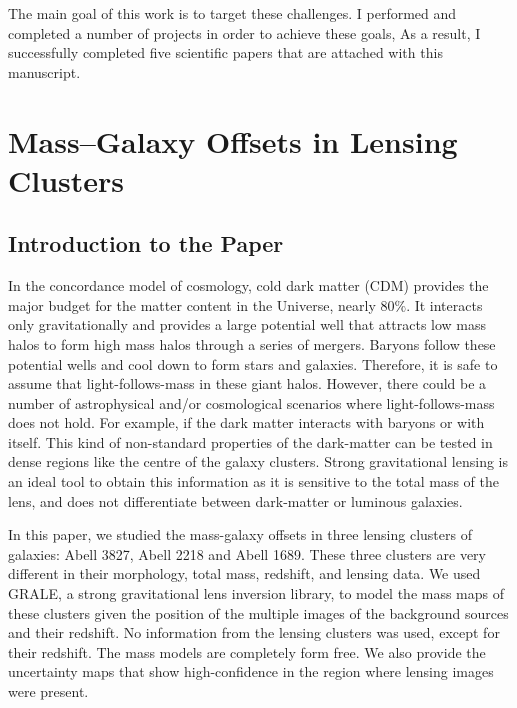 \documentclass[
  11pt,
  twoside,
  openright,
  titlepage,
  headings=optiontoheadandtoc
]{scrbook}
\begin{document}
The main goal of this work is to target these challenges. 
I performed and completed
a number of projects in order to achieve these goals,
As a result, I successfully completed five scientific papers
that are attached with this manuscript.



\chapter{Mass--Galaxy Offsets in Lensing Clusters}
\label{chap:mass-galaxy-offsets}

\section{Introduction to the Paper}

In the concordance model of cosmology, cold dark matter (CDM) provides the major
budget for the matter content in the Universe, nearly 80$\%$. 
It interacts only gravitationally and provides a large potential well that
attracts low mass halos to form high mass halos
through a series of mergers. Baryons follow these potential wells
and cool down to form stars and galaxies. Therefore, it is safe to assume
that light-follows-mass in these giant halos. However, there could be a number of
astrophysical and/or cosmological scenarios where light-follows-mass does not hold. 
For example, if the dark matter interacts with baryons or with itself. This
kind of non-standard properties of the dark-matter can be tested in 
dense regions like the centre of the galaxy clusters. Strong gravitational lensing is 
an ideal tool to obtain this information as it is sensitive to the total
mass of the lens, and does not differentiate between dark-matter or luminous
galaxies.

In this paper, we studied the mass-galaxy offsets in three lensing clusters of galaxies:
Abell 3827, Abell 2218 and Abell 1689. These three clusters are very different in 
their morphology, total mass, redshift, and lensing data. We used GRALE, a strong
gravitational lens inversion library, to model the mass maps of these clusters given
the position of the multiple images of the background sources 
and their redshift. No information
from the lensing clusters was used, except for their redshift. The
mass models are completely form free. We also provide the uncertainty
maps that show high-confidence in the region where lensing images were present. 
\end{document}
